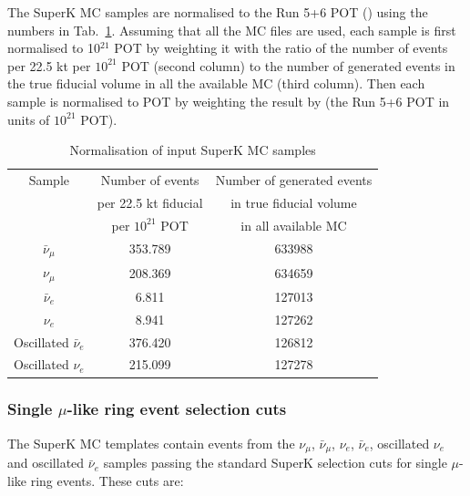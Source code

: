 The SuperK MC samples are normalised to the Run 5+6 POT (\TotalPot) using the numbers in Tab.~\ref{tab:SKMCNormalisation}. 
Assuming that all the MC files are used, each sample is first normalised to 10$^{21}$ POT by weighting it 
with the ratio of the number of events per 22.5 kt per $10^{21}$ POT (second column) to the number of generated 
events in the true fiducial volume in all the available MC (third column). Then each sample is 
normalised to \TotalPot{} POT by weighting the result by \TotalPotPerTwentyOne (the Run 5+6 POT in units of $10^{21}$ POT). 
\begin{table}
\centering
\begin{tabular}{| c | c | c |}
\hline
Sample                        &  Number of events     & Number of generated events \\
                              & per 22.5 kt fiducial  & in true fiducial volume    \\
                              & per $10^{21}$ POT     & in all available MC        \\  
\hline             
$\bar{\nu}_{\mu}$             &     353.789           &       633988               \\
$\nu_{\mu}$                   &     208.369           &       634659               \\
$\bar{\nu}_{e}$               &      6.811            &       127013               \\
$\nu_{e}$                     &      8.941            &       127262               \\
Oscillated $\bar{\nu}_{e}$    &     376.420           &       126812               \\
Oscillated $\nu_{e}$          &     215.099           &       127278               \\
\hline
\end{tabular}
\caption{
  Normalisation of input SuperK MC samples \cite{SuperkMC14a}
}
\label{tab:SKMCNormalisation}
\end{table}

\subsubsection {Single $\mu$-like ring event selection cuts}
\label{sec:mc_templates:1Rmu_cuts}

The SuperK MC templates contain events from the 
$\nu_{\mu}$, $\bar{\nu}_{\mu}$, $\nu_{e}$, $\bar{\nu}_{e}$, oscillated $\nu_{e}$ and oscillated $\bar{\nu}_{e}$ 
 samples passing the standard SuperK selection cuts for single $\mu$-like ring events.
These cuts are:

